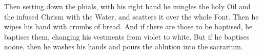 \begin{rubric}
Then setting down the phials, with his right hand he mingles the holy Oil and the infused Chrism with the Water, and scatters it over the whole Font. Then he wipes his hand with crumbs of bread. And if there are those to be baptised, he baptises them, changing his vestments from violet to white. But if he baptises no{\"o}ne, then he washes his hands and pours the ablution into the sacrarium.
\end{rubric}